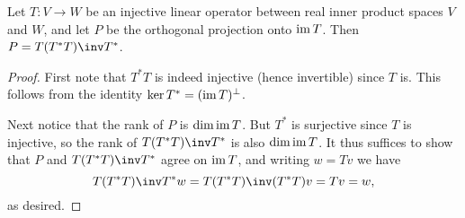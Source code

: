 \documentclass[article, a4paper, 11pt, oneside]{memoir}
\numberwithin{equation}{chapter}
\begin{document}
\begin{proposition}
    Let $T \colon V \to W$ be an injective linear operator between real inner product spaces $V$ and $W$, and let $P$ be the orthogonal projection onto $\operatorname{im} T$. Then $P = T(T^* T)\inv T^*$.
\end{proposition}

\begin{proof}
    First note that $T^* T$ is indeed injective (hence invertible) since $T$ is. This follows from the identity $\ker T^* = (\operatorname{im} T)^\perp$.

    Next notice that the rank of $P$ is $\dim \operatorname{im} T$. But $T^*$ is surjective since $T$ is injective, so the rank of $T(T^* T)\inv T^*$ is also $\dim \operatorname{im} T$. It thus suffices to show that $P$ and $T(T^* T)\inv T^*$ agree on $\operatorname{im} T$, and writing $w = Tv$ we have
    \begin{equation*}
        T(T^* T)\inv T^* w
            = T(T^* T)\inv (T^* T) v
            = Tv
            = w,
    \end{equation*}
    as desired.
\end{proof}




\nocite{*}

\printbibliography
\end{document}
